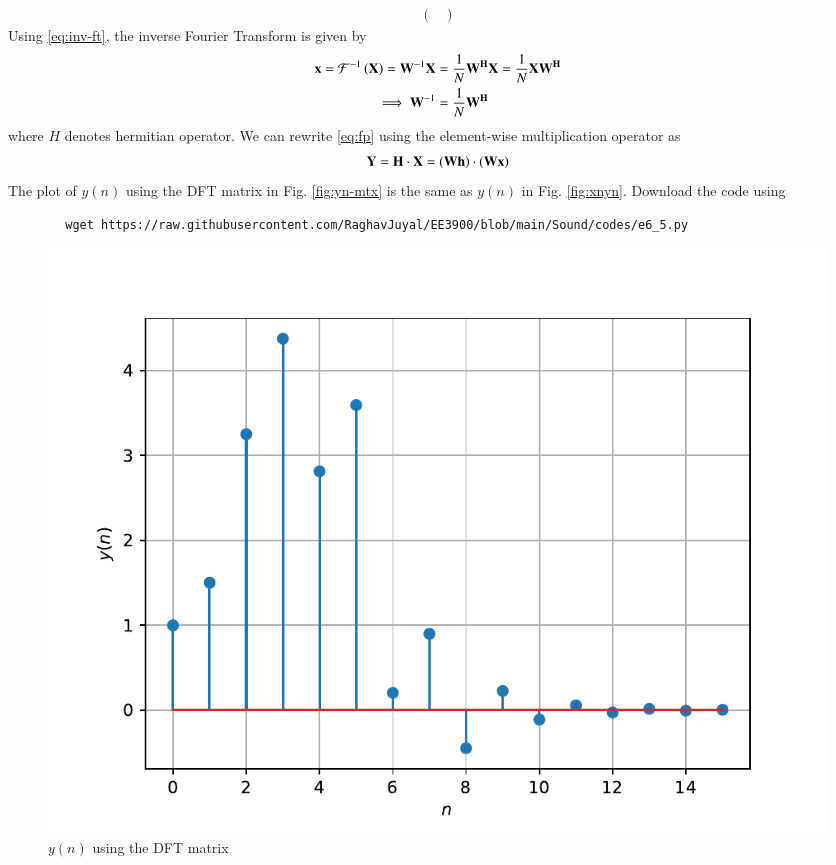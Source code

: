 \documentclass[journal,12pt,twocolumn]{IEEEtran}
\renewcommand\thesection{\arabic{section}}
\begin{document}
\begin{enumerate}[label=\thesection.\arabic*]
\begin{align}
\begin{pmatrix}
		\end{pmatrix}
	\end{align}
	\noindent Using \eqref{eq:inv-ft}, the inverse Fourier Transform is given by
	\begin{align}
		\mathbf{x} = \mathcal{F}^{-1}\left(\mathbf{X}\right) = \mathbf{W}^{-1}\mathbf{X} &= 
		\frac{1}{N}\mathbf{W^{H}}\mathbf{X} = \frac{1}{N}\mathbf{X}\mathbf{W^{H}} \\ 
		\implies \mathbf{W}^{-1} &= \frac{1}{N}\mathbf{W^{H}}
	\end{align}
	\noindent where $H$ denotes hermitian operator. We can rewrite \eqref{eq:fp} using the
	element-wise multiplication operator as
	\begin{align}
		\mathbf{Y} = \mathbf{H}\cdot\mathbf{X} = \left(\mathbf{W}\mathbf{h}\right)\cdot\left(\mathbf{W}\mathbf{x}\right)
	\end{align}
	The plot of $y(n)$ using the DFT matrix in Fig. \eqref{fig:yn-mtx} is the same as $y(n)$ in 
	Fig. \eqref{fig:xnyn}. Download the code using
	\begin{lstlisting}
		wget https://raw.githubusercontent.com/RaghavJuyal/EE3900/blob/main/Sound/codes/e6_5.py
	\end{lstlisting}
\end{enumerate}
\begin{figure}[!htb]
\centering
\includegraphics[width=\columnwidth]{figs/prob_6-5.pdf}
\caption{$y(n)$ using the DFT matrix}
\label{fig:yn-mtx}
\end{figure}
\end{document}
